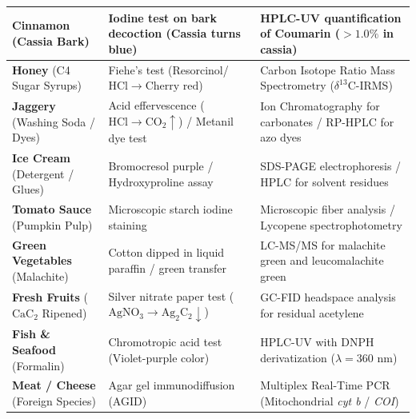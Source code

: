 \documentclass[11pt,a4paper,oneside]{article}
\begin{document}
\begin{center}
\begin{tabular}{@{}p{3.8cm} p{5.6cm} p{6.6cm}@{}}
\textbf{Cinnamon} (Cassia Bark) & Iodine test on bark decoction (Cassia turns blue) & HPLC-UV quantification of Coumarin ($>1.0\%$ in cassia) \tabularnewline
\midrule
\textbf{Honey} (C4 Sugar Syrups) & Fiehe's test (Resorcinol/$\mathrm{HCl} \to \text{Cherry red}$) & Carbon Isotope Ratio Mass Spectrometry ($\delta^{13}\mathrm{C}$-IRMS) \tabularnewline
\textbf{Jaggery} (Washing Soda / Dyes) & Acid effervescence ($\mathrm{HCl} \to \mathrm{CO_2}\uparrow$) / Metanil dye test & Ion Chromatography for carbonates / RP-HPLC for azo dyes \tabularnewline
\midrule
\textbf{Ice Cream} (Detergent / Glues) & Bromocresol purple / Hydroxyproline assay & SDS-PAGE electrophoresis / HPLC for solvent residues \tabularnewline
\textbf{Tomato Sauce} (Pumpkin Pulp) & Microscopic starch iodine staining & Microscopic fiber analysis / Lycopene spectrophotometry \tabularnewline
\midrule
\textbf{Green Vegetables} (Malachite) & Cotton dipped in liquid paraffin / green transfer & LC-MS/MS for malachite green and leucomalachite green \tabularnewline
\textbf{Fresh Fruits} ($\mathrm{CaC_2}$ Ripened) & Silver nitrate paper test ($\mathrm{AgNO_3} \to \mathrm{Ag_2C_2}\downarrow$) & GC-FID headspace analysis for residual acetylene \tabularnewline
\textbf{Fish \& Seafood} (Formalin) & Chromotropic acid test (Violet-purple color) & HPLC-UV with DNPH derivatization ($\lambda = 360\text{ nm}$) \tabularnewline
\midrule
\textbf{Meat / Cheese} (Foreign Species) & Agar gel immunodiffusion (AGID) & Multiplex Real-Time PCR (Mitochondrial \textit{cyt b} / \textit{COI}) \tabularnewline
\bottomrule
\end{tabular}
\end{center}
\end{document}
